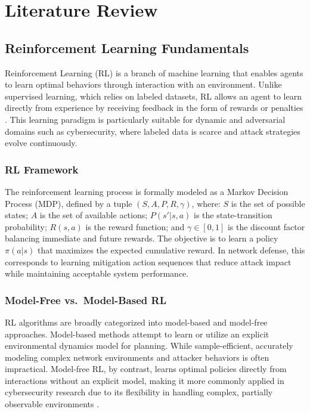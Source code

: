 \documentclass[conference]{IEEEtran}
\begin{document}
\section{Literature Review}

\subsection{Reinforcement Learning Fundamentals}

Reinforcement Learning (RL) is a branch of machine learning that enables
agents to learn optimal behaviors through interaction with an environment.
Unlike supervised learning, which relies on labeled datasets, RL allows an
agent to learn directly from experience by receiving feedback in the form
of rewards or penalties \cite{sutton2018rl}. This learning paradigm is
particularly suitable for dynamic and adversarial domains such as
cybersecurity, where labeled data is scarce and attack strategies evolve
continuously.

\subsubsection{RL Framework}
The reinforcement learning process is formally modeled as a Markov Decision
Process (MDP), defined by a tuple $(S, A, P, R, \gamma)$, where: $S$ is
the set of possible states; $A$ is the set of available actions;
$P(s'|s,a)$ is the state-transition probability; $R(s,a)$ is the reward
function; and $\gamma \in [0,1]$ is the discount factor balancing immediate
and future rewards. The objective is to learn a policy $\pi(a|s)$ that
maximizes the expected cumulative reward. In network defense, this
corresponds to learning mitigation action sequences that reduce attack
impact while maintaining acceptable system performance.

\subsubsection{Model-Free vs.\ Model-Based RL}
RL algorithms are broadly categorized into model-based and model-free
approaches. Model-based methods attempt to learn or utilize an explicit
environmental dynamics model for planning. While sample-efficient, accurately
modeling complex network environments and attacker behaviors is often
impractical. Model-free RL, by contrast, learns optimal policies directly
from interactions without an explicit model, making it more commonly
applied in cybersecurity research due to its flexibility in handling
complex, partially observable environments \cite{nguyen2021drl}.
\end{document}
